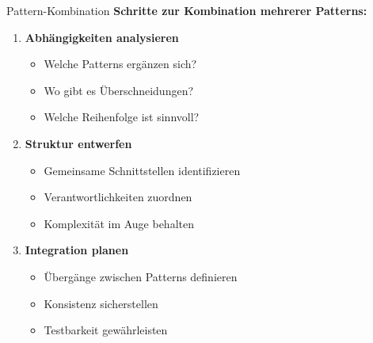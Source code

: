 \begin{KR}{Pattern-Kombination}
\textbf{Schritte zur Kombination mehrerer Patterns:}
\begin{enumerate}
    \item \textbf{Abhängigkeiten analysieren}
    \begin{itemize}
        \item Welche Patterns ergänzen sich?
        \item Wo gibt es Überschneidungen?
        \item Welche Reihenfolge ist sinnvoll?
    \end{itemize}
    
    \item \textbf{Struktur entwerfen}
    \begin{itemize}
        \item Gemeinsame Schnittstellen identifizieren
        \item Verantwortlichkeiten zuordnen
        \item Komplexität im Auge behalten
    \end{itemize}
    
    \item \textbf{Integration planen}
    \begin{itemize}
        \item Übergänge zwischen Patterns definieren
        \item Konsistenz sicherstellen
        \item Testbarkeit gewährleisten
    \end{itemize}
\end{enumerate}
\end{KR}



